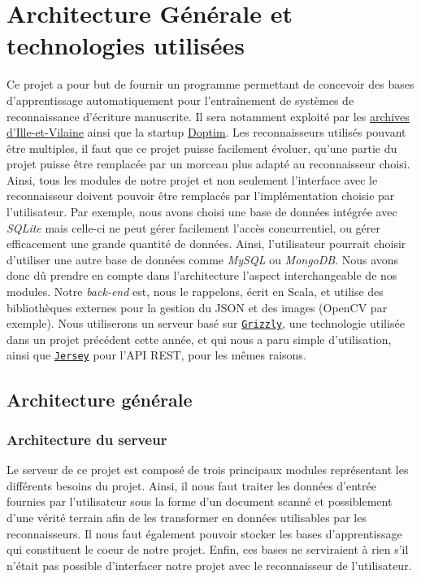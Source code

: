 \chapter{Architecture Générale et technologies utilisées}

Ce projet a pour but de fournir un programme permettant de concevoir des bases d'apprentissage automatiquement pour l'entraînement de systèmes de reconnaissance d'écriture manuscrite. Il sera notamment exploité par les \href{http://archives.ille-et-vilaine.fr/fr}{archives d'Ille-et-Vilaine} ainsi que la startup \href{http://www.doptim.eu}{Doptim}. Les reconnaisseurs utilisés pouvant être multiples, il faut que ce projet puisse facilement évoluer, qu'une partie du projet puisse être remplacée par un morceau plus adapté au reconnaisseur choisi. Ainsi, tous les modules de notre projet et non seulement l'interface avec le reconnaisseur doivent pouvoir être remplacés par l'implémentation choisie par l'utilisateur. Par exemple, nous avons choisi une base de données intégrée avec \textit{SQLite} mais celle-ci ne peut gérer facilement l'accès concurrentiel, ou gérer efficacement une grande quantité de données. Ainsi, l'utilisateur pourrait choisir d'utiliser une autre base de données comme \textit{MySQL} ou \textit{MongoDB}. Nous avons donc dû prendre en compte dans l'architecture l'aspect interchangeable de nos modules. Notre \textit{back-end} est, nous le rappelons, écrit en Scala, et utilise des bibliothèques externes pour la gestion du JSON et des images (OpenCV par exemple). Nous utiliserons un serveur basé sur \href{https://javaee.github.io/grizzly}{\texttt{Grizzly}}, une technologie utilisée dans un projet précédent cette année, et qui nous a paru simple d'utilisation, ainsi que \href{https://jersey.github.io}{\texttt{Jersey}} pour l'API REST, pour les mêmes raisons.

\section{Architecture générale}

\subsection{Architecture du serveur}
Le serveur de ce projet est composé de trois principaux modules représentant les différents besoins du projet. Ainsi, il nous faut traiter les données d'entrée fournies par l'utilisateur sous la forme d'un document scanné et possiblement d'une vérité terrain afin de les transformer en données utilisables par les reconnaisseurs. Il nous faut également pouvoir stocker les bases d'apprentissage qui constituent le coeur de notre projet. Enfin, ces bases ne serviraient à rien s'il n'était pas possible d'interfacer notre projet avec le reconnaisseur de l'utilisateur.

